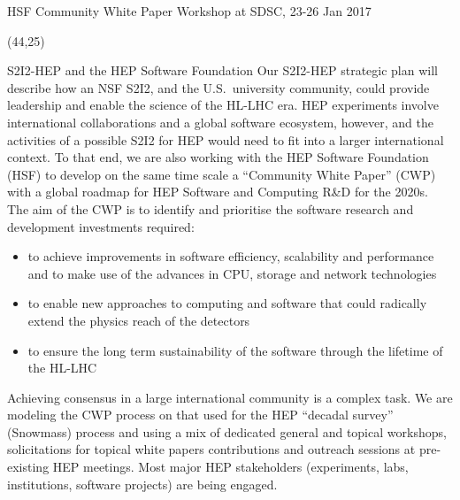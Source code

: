 \documentclass[final]{beamer}
\begin{document}
\begin{frame}{}
\begin{textblock}{38.0}
\begin{block}{HSF Community White Paper Workshop at SDSC, 23-26 Jan 2017}
\begin{textblock}{38.0}(44,25)
\begin{block}{S2I2-HEP and the HEP Software Foundation}
Our S2I2-HEP strategic plan will describe how an NSF S2I2, and the
U.S.\ university community, could provide leadership and enable the
science of the HL-LHC era.  HEP experiments involve international
collaborations and a global software ecosystem, however, and the
activities of a possible S2I2 for HEP would need to fit into a
larger international context. To that end, we are also working with
the HEP Software Foundation (HSF) to develop on the same time scale
a ``Community White Paper'' (CWP) with a global roadmap for HEP
Software and Computing R\&D for the 2020s. The aim of the CWP is
to identify and prioritise the software research and development
investments required:

\begin{itemize}
\item to achieve improvements in software efficiency, scalability and performance and to make use of the advances in CPU, storage and network technologies
\item to enable new approaches to computing and software that could radically extend the physics reach of the detectors
\item to ensure the long term sustainability of the software through the lifetime of the HL-LHC
\end{itemize}

Achieving consensus in a large international community is a complex task. We are modeling the CWP process on that used for the HEP ``decadal survey'' (Snowmass) process and using a mix of dedicated general and topical workshops, solicitations for topical white papers contributions and outreach sessions at pre-existing HEP meetings. Most major HEP stakeholders (experiments, labs, institutions, software projects) are being engaged.
\end{block}
\end{textblock}





\end{block}
\end{textblock}
\end{frame}
\end{document}
